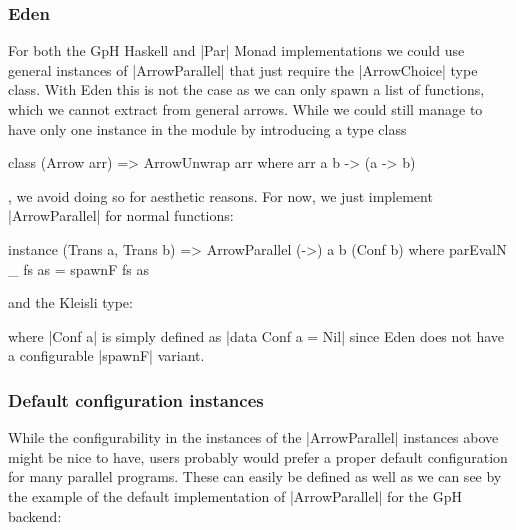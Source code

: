\subsubsection{Eden}
For both the GpH Haskell and |Par| Monad implementations we could use general instances of |ArrowParallel| that just require the |ArrowChoice| type class. With Eden this is not the case as we can only spawn a list of functions, which we cannot extract from general arrows. While we could still manage to have only one instance in the module by introducing a type class %
\begin{code}
class (Arrow arr) => ArrowUnwrap arr where
	arr a b -> (a -> b)
\end{code}
, we avoid doing so for aesthetic reasons. For now, we just implement |ArrowParallel| for normal functions: %
\begin{code}
instance (Trans a, Trans b) => ArrowParallel (->) a b (Conf b) where
    parEvalN _ fs as = spawnF fs as
\end{code}
and the Kleisli type: %
where |Conf a| is simply defined as |data Conf a = Nil| since Eden does not have a configurable |spawnF| variant.

\subsubsection{Default configuration instances}
While the configurability in the instances of the |ArrowParallel| instances above might be nice to have, users probably would prefer a proper default configuration for many parallel programs. These can easily be defined as well as we can see by the example of the default implementation of |ArrowParallel| for the GpH backend:


